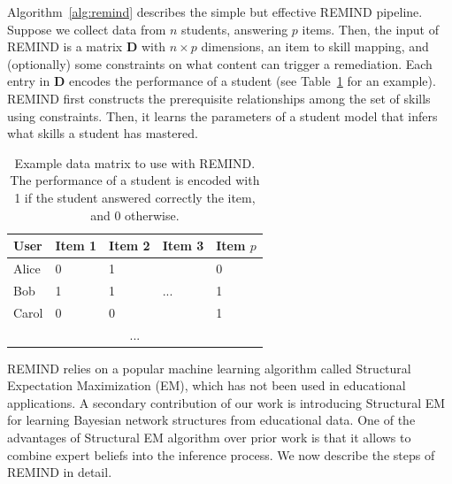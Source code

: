 \documentclass{edm_template}
\newcommand{\hl}[1]{\colorbox{yellow}{#1}}
\begin{document}
Algorithm~\ref{alg:remind} describes the simple but effective REMIND pipeline.
Suppose we collect data from  $n$ students, answering $p$ items.
Then, the input of REMIND is a matrix $\mathbf{D}$ with $n \times p$ dimensions, an item to skill mapping, and (optionally) some constraints on what content can trigger a remediation.
Each entry in $\mathbf{D}$ encodes the performance of a student (see Table~\ref{tbl:d-matrix} for an example).
REMIND first constructs the prerequisite relationships among the set of skills using constraints.
Then, it  learns the parameters of a student model  that infers what skills a student has mastered.


\begin{table}[htb]%
	\centering
	\caption{Example data matrix to use with REMIND.  The performance of a student is encoded with 1 if the student answered correctly the item, and 0 otherwise. \label{tbl:d-matrix}}
	\begin{tabular}{@{}lllll@{}}
		\toprule
		User  & Item 1 & Item 2 & Item 3 & Item $p$ \\ \midrule
		Alice & 0      & 1      &        & 0        \\
		Bob   & 1      & 1      & ...    & 1        \\
		Carol & 0      & 0      &        & 1        \\
		\multicolumn{5}{c}{...}                     \\ \bottomrule
	\end{tabular}
\end{table}


REMIND relies on a popular machine learning algorithm called Structural Expectation Maximization (EM), which has not been used in educational applications. 
A secondary contribution of our work is introducing Structural EM for learning Bayesian network structures from educational data.
One of the advantages of Structural EM algorithm over prior work is that it allows to combine expert beliefs into the inference process.
We now describe the  steps of REMIND in detail.
\end{document}
